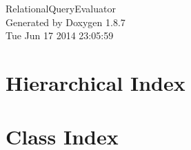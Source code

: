 \documentclass[twoside]{book}
\newcommand{\+}{\discretionary{\mbox{\scriptsize$\hookleftarrow$}}{}{}}
\newcommand{\clearemptydoublepage}{%
  \newpage{\pagestyle{empty}\cleardoublepage}%
}
\begin{document}
\hypersetup{pageanchor=false,
             bookmarks=true,
             bookmarksnumbered=true,
             pdfencoding=unicode
            }
\begin{titlepage}
\vspace*{7cm}
\begin{center}%
{\Large Relational\+Query\+Evaluator }\\
\vspace*{1cm}
{\large Generated by Doxygen 1.8.7}\\
\vspace*{0.5cm}
{\small Tue Jun 17 2014 23:05:59}\\
\end{center}
\end{titlepage}
\clearemptydoublepage
\tableofcontents
\clearemptydoublepage
{}
\hypersetup{pageanchor=true}

\chapter{Hierarchical Index}

\chapter{Class Index}

\end{document}
